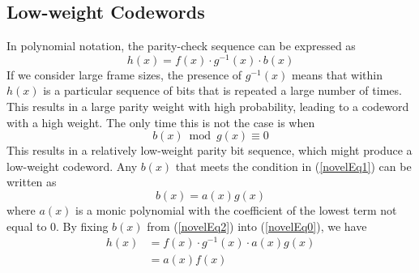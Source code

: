 \subsection{Low-weight Codewords}

In polynomial notation, the parity-check sequence can be expressed as 
\begin{equation}
h(x) =f(x)\cdot g^{-1}(x)\cdot b(x)
\label{novelEq0}
\end{equation}
If we consider large frame sizes, the presence of $g^{-1}(x)$ means that within $h(x)$ is a particular sequence of bits that is repeated a large number of times. This results in a large parity weight with high probability, leading to a codeword with a high weight. The only time this is not the case is when
\begin{equation}
b(x) \bmod g(x) \equiv 0
\label{novelEq1}
\end{equation}
This results in a relatively low-weight parity bit sequence, which might produce a low-weight codeword. Any $b(x)$ that meets the condition in (\ref{novelEq1}) can be written as 
\begin{equation}
b(x) =a(x)g(x)
\label{novelEq2}
\end{equation}
where $a(x)$ is a monic polynomial with the coefficient of the lowest term not equal to $0$.
By fixing $b(x)$ from (\ref{novelEq2}) into (\ref{novelEq0}), we have 
\begin{equation}
\begin{split}
h(x)&=f(x)\cdot g^{-1}(x)\cdot a(x)g(x)\\
&=a(x)f(x)
\end{split}
\label{novelEq3}
\end{equation}
